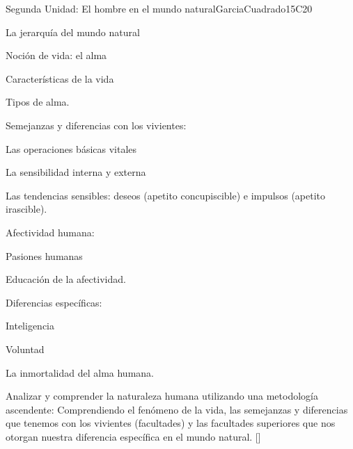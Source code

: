 \begin{syllabus}
\begin{unit}{}{Segunda Unidad: El hombre en el mundo natural}{GarciaCuadrado}{15}{C20}
\begin{topics}
	\item La jerarquía del mundo natural 
		\begin{subtopics} 
			\item Noción de vida: el alma
			\item Características de la vida
			\item Tipos de alma. 
		\end{subtopics}
	\item Semejanzas y diferencias con los vivientes: 
		\begin{subtopics} 
			\item Las operaciones básicas vitales
			\item La sensibilidad interna y externa
			\item Las tendencias sensibles: deseos (apetito concupiscible) e impulsos (apetito irascible).
		\end{subtopics}
	\item Afectividad humana:
		\begin{subtopics}
			 \item Pasiones humanas
			\item Educación de la afectividad.
		\end{subtopics}
	\item Diferencias específicas: 
		\begin{subtopics} 
			\item Inteligencia
			\item Voluntad
			\item La inmortalidad del alma humana.
		\end{subtopics}
\end{topics}
\begin{learningoutcomes}
	\item Analizar y comprender la naturaleza humana utilizando una metodología ascendente: Comprendiendo el fenómeno de la vida, las semejanzas y diferencias que tenemos con los vivientes (facultades) y las facultades superiores que nos otorgan nuestra diferencia específica en el mundo natural. [\Usage]
\end{learningoutcomes}
\end{unit}


\end{syllabus}
